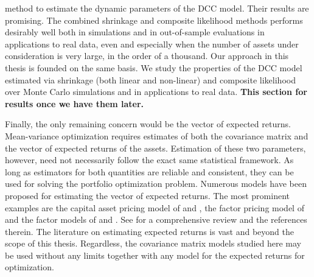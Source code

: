 method to estimate the dynamic parameters of the DCC model. Their results are promising. The combined shrinkage and composite likelihood methods performs desirably well both in simulations and in out-of-sample evaluations in applications to real data, even and especially when the number of assets under consideration is very large, in the order of a thousand. Our approach in this thesis is founded on the same basis. We study the properties of the DCC model estimated via shrinkage (both linear and non-linear) and composite likelihood over Monte Carlo simulations and in applications to real data. \textbf{This section for results once we have them later.}

Finally, the only remaining concern would be the vector of expected returns. Mean-variance optimization requires estimates of both the covariance matrix and the vector of expected returns of the assets. Estimation of these two parameters, however, need not necessarily follow the exact same statistical framework. As long as estimators for both quantities are reliable and consistent, they can be used for solving the portfolio optimization problem. Numerous models have been proposed for estimating the vector of expected returns. The most prominent examples are the capital asset pricing model of \textcite{SHARPE1964} and \textcite{LINTNER1965}, the factor pricing model of \textcite{ROSS1976341} and the factor models of \textcite{FAMAFRENCH1992} and \textcite{FAMAFRENCH2015}. See \textcite{GREENETAL} for a comprehensive review and the references therein. The literature on estimating expected returns is vast and beyond the scope of this thesis. Regardless, the covariance matrix models studied here may be used without any limits together with any model for the expected returns for optimization.